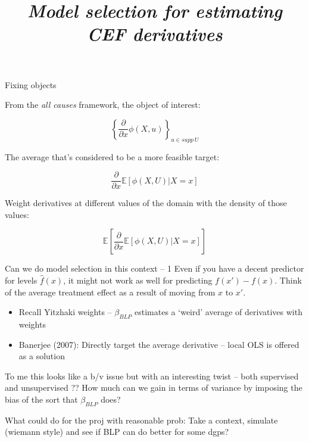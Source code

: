 \documentclass[10pt,xcolor=table]{beamer}
\title[estimating average cef derivative]{\textit{Model selection for estimating CEF derivatives}}
\begin{document}


\begin{frame}[plain]
    \titlepage
\end{frame}

\begin{frame}{Fixing objects}

From the \textit{all causes} framework, the object of interest:

	\begin{equation}
	\left\{ \frac{\partial}{\partial x} \phi(X, u) \right\}_{u \in supp \, U}
\end{equation}

The average that's considered to be a more feasible target:

\begin{equation}
	\frac{\partial}{\partial x} \mathbb{E} \left[ \phi(X, U) | X = x \right]
\end{equation}

Weight derivatives at different values of the domain with the density of those values:

\begin{equation}
	\mathbb{E} \left[ \frac{\partial}{\partial x} \mathbb{E} \left[ \phi(X, U) | X = x \right] \right]
\end{equation}


\end{frame}

\begin{frame}{Can we do model selection in this context -- 1}
	Even if you have a decent predictor for levels $\hat f(x)$, it might not work as well for predicting $f(x') - f(x)$. Think of the average treatment effect as a result of moving from $x$ to $x'$.
	
	\begin{itemize}
		\item Recall Yitzhaki weights -- $\beta_{BLP}$ estimates a `weird' average of derivatives with weights
		\item Banerjee (2007): Directly target the average derivative -- local OLS is offered as a solution
	\end{itemize}
	
To me this looks like a b/v issue but with an interesting twist -- both supervised and unsupervised ?? How much can we gain in terms of variance by imposing the bias of the sort that $\beta_{BLP}$ does?

What could do for the proj with reasonable prob: Take a context, simulate (wiemann style) and see if BLP can do better for some dgps?
\end{frame}
\end{document}
